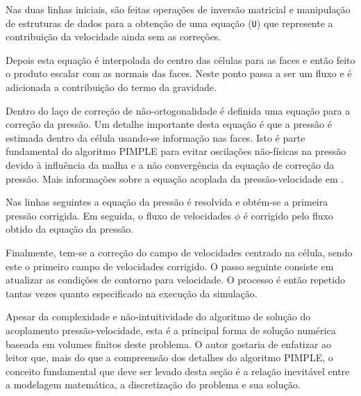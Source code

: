 \documentclass[12pt,openright,twoside,a4paper,english,french,spanish,brazil]{abntex2}
\begin{document}
Nas duas linhas iniciais, são feitas operações de inversão matricial e 
manipulação de estruturas de dados para a obtenção de uma equação 
(\texttt{U})
que represente a contribuição da velocidade ainda sem as correções.

Depois esta equação é interpolada do centro das células para as faces 
e então feito o produto escalar com as normais das faces. Neste ponto 
passa a ser um fluxo e é adicionada a contribuição do termo da gravidade.

Dentro do laço de correção de não-ortogonalidade é definida uma equação 
para a correção da pressão. Um detalhe importante desta equação é que 
a pressão é estimada dentro da célula usando-se informação nas faces. 
Isto é parte fundamental do algoritmo PIMPLE para evitar oscilações 
não-físicas na pressão devido à influência da malha e a não 
convergência da equação de correção da pressão. Mais informações 
sobre a equação acoplada da pressão-velocidade em \cite{Anderson95}.

Nas linhas seguintes a equação da pressão é resolvida e obtém-se a 
primeira pressão corrigida. Em seguida, o fluxo de velocidades $\phi$ 
é corrigido pelo fluxo obtido da equação da pressão.

Finalmente, tem-se a correção do campo de velocidades centrado na 
célula, sendo este o primeiro campo de velocidades corrigido. O passo 
seguinte consiste em atualizar as condições de contorno para velocidade.
O processo é então repetido tantas vezes quanto especificado na execução 
da simulação.

Apesar da complexidade e não-intuitividade do algoritmo de solução do 
acoplamento pressão-velocidade, esta é a principal forma de solução 
numérica baseada em volumes finitos deste problema. O autor gostaria 
de enfatizar ao leitor que, mais do que a compreensão dos detalhes 
do algoritmo PIMPLE, o conceito fundamental que deve ser levado desta 
seção é a relação inevitável entre a modelagem matemática, a discretização 
do problema e sua solução.
\end{document}
